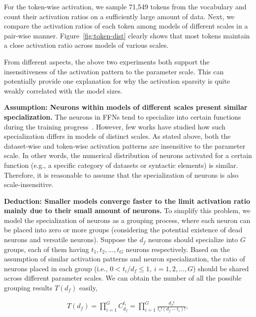 \documentclass{article} %
\begin{document}
For the token-wise activation, we sample 71,549 tokens from the vocabulary and count their activation ratios on a sufficiently large amount of data. Next, we compare the activation ratios of each token among models of different scales in a pair-wise manner. Figure~\ref{fig:token-dist} clearly shows that most tokens maintain a close activation ratio across models of various scales.


From different aspects, the above two experiments both support the insensitiveness of the activation pattern to the parameter scale. This can potentially provide one explanation for why the activation sparsity is quite weakly correlated with the model sizes.

\textbf{Assumption: Neurons within models of different scales present similar specialization.} The neurons in FFNs tend to specialize into certain functions during the training progress~\citep{li2022lazy,zhang2023emergent}. However, few works have studied how such specialization differs in models of distinct scales. As stated above, both the dataset-wise and token-wise activation patterns are insensitive to the parameter scale. In other words, the numerical distribution of neurons activated for a certain function (e.g., a specific category of datasets or syntactic elements) is similar. Therefore, it is reasonable to assume that the specialization of neurons is also scale-insensitive.

\textbf{Deduction: Smaller models converge faster to the limit activation ratio mainly due to their small amount of neurons.} To simplify this problem, we model the specialization of neurons as a grouping process, where each neuron can be placed into zero or more groups (considering the potential existence of dead neurons and versatile neurons). Suppose the $d_f$ neurons should specialize into $G$ groups, each of them having $t_1,t_2,...,t_G$ neurons respectively. Based on the assumption of similar activation patterns and neuron specialization, the ratio of neurons placed in each group (i.e., $0<t_i/d_f\leq 1,\ i=1,2,...,G$) should be shared across different parameter scales. We can obtain the number of all the possible grouping results $T(d_f)$ easily,


\begin{equation}
    \begin{aligned}
    \label{eq:possible-group}
    T(d_f)=\prod_{i=1}^G C_{d_f}^{t_i} = \prod_{i=1}^G \frac{d_f!}{t_i!(d_f-t_i)!},
    \end{aligned}
\end{equation}
\end{document}
